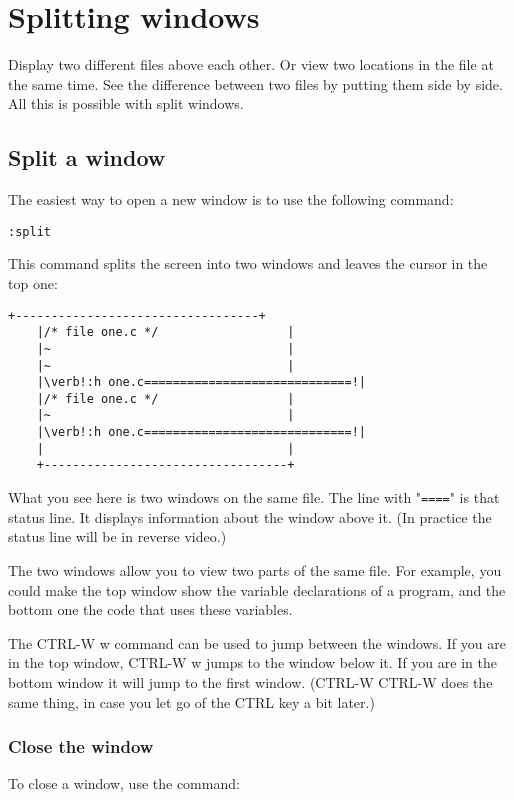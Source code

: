 \section{Splitting windows}
Display two different files above each other.
Or view two locations in the file at the same time.
See the difference between two files by putting them side by side.
All this is possible with split windows.
\subsection{Split a window}

The easiest way to open a new window is to use the following command:

 \begin{Verbatim}[samepage=true]
 :split
 \end{Verbatim}

This command splits the screen into two windows and leaves the cursor in the top one:

\begin{Verbatim}[samepage=true]
    +----------------------------------+
    |/* file one.c */                  |
    |~                                 |
    |~                                 |
    |\verb!:h one.c=============================!|
    |/* file one.c */                  |
    |~                                 |
    |\verb!:h one.c=============================!|
    |                                  |
    +----------------------------------+
\end{Verbatim}

What you see here is two windows on the same file.
The line with "\verb!====!" is that status line.
It displays information about the window above it.
(In practice the status line will be in reverse video.)

The two windows allow you to view two parts of the same file.
For example, you could make the top window show the variable declarations of a program, and the bottom one the code that uses these variables.

The CTRL-W w command can be used to jump between the windows.
If you are in the top window, CTRL-W w jumps to the window below it.
If you are in the bottom window it will jump to the first window.
(CTRL-W CTRL-W does the same thing, in case you let go of the CTRL key a bit later.)

\subsubsection{Close the window}
To close a window, use the command:

